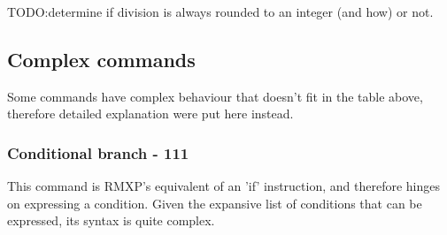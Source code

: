 \documentclass[11pt]{article}
\begin{document}
TODO:determine if division is always rounded to an integer (and how) or not.


\subsection{Complex commands}

Some commands have complex behaviour that doesn't fit in the table above, therefore detailed explanation were put here instead.


\subsubsection{Conditional branch - 111}
\label{sec:condbranch}

This command is RMXP's equivalent of an 'if' instruction, and therefore hinges on expressing a condition. Given the expansive list of conditions that can be expressed, its syntax is quite complex.
\end{document}
